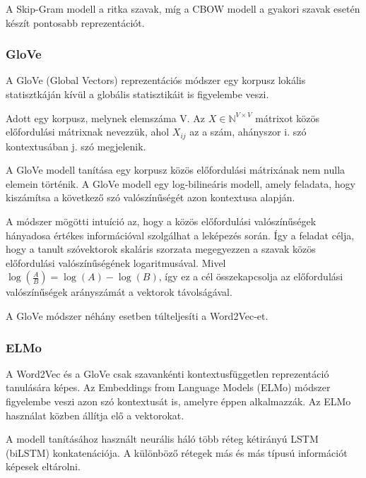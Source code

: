 \begin{note}
	A Skip-Gram modell a ritka szavak, míg a CBOW modell a gyakori szavak esetén készít pontosabb reprezentációt.
\end{note}


\subsubsection{GloVe}
A GloVe (Global Vectors) reprezentációs módszer egy korpusz lokális statisztkáján kívül a globális statisztikáit is figyelembe veszi. 

\begin{definition}
	Adott egy korpusz, melynek elemszáma V. Az $X \in \mathbb{N}^{V \times V}$ mátrixot közös előfordulási mátrixnak nevezzük, ahol $X_{ij}$ az a szám, ahányszor i. szó kontextusában j. szó megjelenik.  
\end{definition}

A GloVe modell tanítása egy korpusz közös előfordulási mátrixának nem nulla elemein történik. A GloVe modell egy log-bilineáris modell, amely feladata, hogy kiszámítsa a következő szó valószínűségét azon kontextusa alapján.

A módszer mögötti intuíció az, hogy a közös előfordulási valószínűségek hányadosa értékes információval szolgálhat a leképezés során. Így a feladat célja, hogy a tanult szóvektorok skaláris szorzata megegyezzen a szavak közös előfordulási valószínűségének logaritmusával. Mivel $\log \left( \frac{A}{B} \right) = \log \left( A \right) - \log \left( B \right)$, így ez a cél összekapcsolja az előfordulási valószínűségek arányszámát a vektorok távolságával.

\begin{note}
	A GloVe módszer néhány esetben túlteljesíti a Word2Vec-et.
\end{note}

\subsubsection{ELMo}
A Word2Vec és a GloVe csak szavankénti kontextusfüggetlen reprezentáció tanulására képes. Az Embeddings from Language Models (ELMo) módszer figyelembe veszi azon szó kontextusát is, amelyre éppen alkalmazzák. Az ELMo használat közben állítja elő a vektorokat.

A modell tanításához használt neurális háló több réteg kétirányú LSTM (biLSTM) konkatenációja. A különböző rétegek más és más típusú információt képesek eltárolni.

